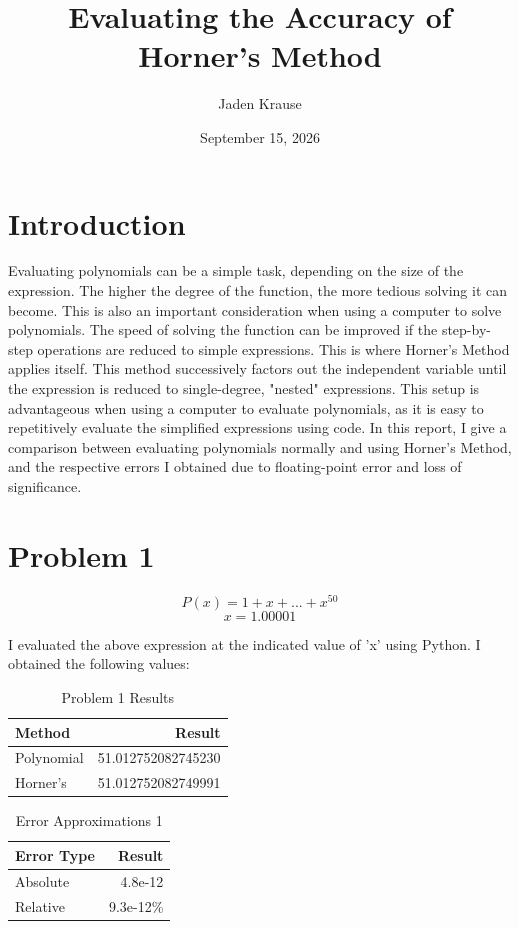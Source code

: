 \documentclass{article}
\title{Evaluating the Accuracy of Horner's Method}
\author{Jaden Krause}
\date{September 15, 2026}
\begin{document}
\maketitle %
\section{Introduction}

Evaluating polynomials can be a simple task, depending on the size
of the expression. The higher the degree of the function, the more tedious
solving it can become. This is also an important consideration when using 
a computer to solve polynomials. The speed of solving the function can be 
improved if the step-by-step operations are reduced to simple expressions. 
This is where Horner's Method applies itself. This method successively factors out 
the independent variable until the expression is reduced to single-degree, "nested" 
expressions. This setup is advantageous when using a computer to evaluate polynomials,
as it is easy to repetitively evaluate the simplified expressions using code. In this report, 
I give a comparison between evaluating polynomials normally and using Horner's Method,
and the respective errors I obtained due to floating-point error and loss of significance.

\section{Problem 1}
$$ P(x) = 1 + x + ... + x^{50} $$
$$ x = 1.00001 $$

I evaluated the above expression at the indicated value of 'x' using Python. I 
obtained the following values:

\begin{table}[H]
\centering
\begin{tabular}{|l|r|}
\hline
Method & Result \\ \hline
Polynomial & 51.012752082745230 \\ \hline
Horner's & 51.012752082749991 \\ \hline
\end{tabular}
\caption{Problem 1 Results}
\label{tab:problem_1_results}
\end{table}

\begin{table}[H]
\centering
\begin{tabular}{|l|r|}
\hline
Error Type & Result \\ \hline
Absolute & 4.8e-12 \\ \hline
Relative & 9.3e-12\% \\ \hline
\end{tabular}
\caption{Error Approximations 1}
\label{tab:error_approximations_1}
\end{table}
\end{document}

